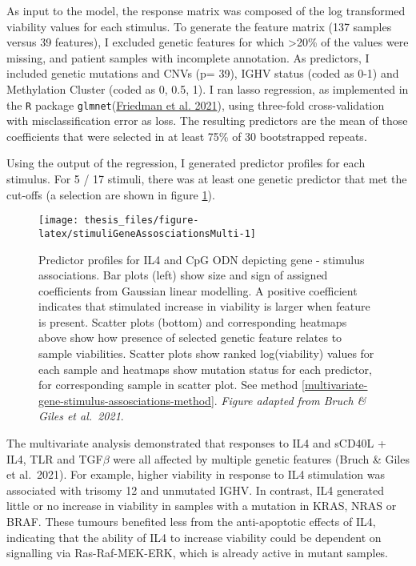 \documentclass[11pt, a4paper, twosided]{book}
\begin{document}
As input to the model, the response matrix was composed of the log transformed viability values for each stimulus. To generate the feature matrix (137 samples versus 39 features), I excluded genetic features for which \textgreater20\% of the values were missing, and patient samples with incomplete annotation. As predictors, I included genetic mutations and CNVs (p= 39), IGHV status (coded as 0-1) and Methylation Cluster (coded as 0, 0.5, 1). I ran lasso regression, as implemented in the \texttt{R} package \texttt{glmnet}(\protect\hyperlink{ref-R-glmnet}{Friedman et al. 2021}), using three-fold cross-validation with misclassification error as loss. The resulting predictors are the mean of those coefficients that were selected in at least 75\% of 30 bootstrapped repeats.

Using the output of the regression, I generated predictor profiles for each stimulus. For 5 / 17 stimuli, there was at least one genetic predictor that met the cut-offs (a selection are shown in figure \ref{fig:stimuliGeneAssosciationsMulti}).


\begin{figure}

{\centering \texttt{[image: thesis\_files/figure-latex/stimuliGeneAssosciationsMulti-1]} 

}

\caption{Predictor profiles for IL4 and CpG ODN depicting gene - stimulus associations. Bar plots (left) show size and sign of assigned coefficients from Gaussian linear modelling. A positive coefficient indicates that stimulated increase in viability is larger when feature is present. Scatter plots (bottom) and corresponding heatmaps above show how presence of selected genetic feature relates to sample viabilities. Scatter plots show ranked log(viability) values for each sample and heatmaps show mutation status for each predictor, for corresponding sample in scatter plot. See method \ref{multivariate-gene-stimulus-assosciations-method}. \emph{Figure adapted from Bruch \& Giles et al.~2021}.}\label{fig:stimuliGeneAssosciationsMulti}
\end{figure}
The multivariate analysis demonstrated that responses to IL4 and sCD40L + IL4, TLR and TGF\(\beta\) were all affected by multiple genetic features (Bruch \& Giles et al.~2021). For example, higher viability in response to IL4 stimulation was associated with trisomy 12 and unmutated IGHV. In contrast, IL4 generated little or no increase in viability in samples with a mutation in KRAS, NRAS or BRAF. These tumours benefited less from the anti-apoptotic effects of IL4, indicating that the ability of IL4 to increase viability could be dependent on signalling via Ras-Raf-MEK-ERK, which is already active in mutant samples.
\end{document}

